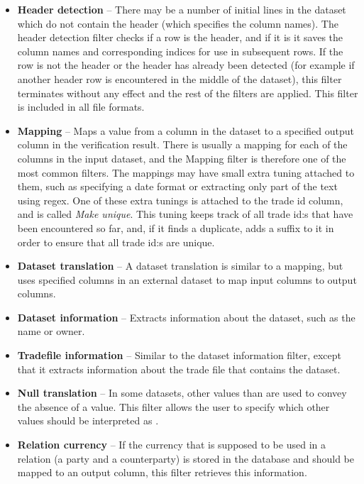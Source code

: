 \begin{itemize}
\item \textbf{Header detection} --
There may be a number of initial lines in the dataset which do not contain the header (which specifies the column names). The header detection filter checks if a row is the header,
and if it is it saves the column names and corresponding indices for use in subsequent rows. If the row is not the header or the header has already been detected
(for example if another header row is encountered in the middle of the dataset), this filter terminates without any effect and the rest of the filters are applied.
This filter is included in all file formats.

\item \textbf{Mapping} --
Maps a value from a column in the dataset to a specified output column in the verification result. There is usually a mapping for each of the columns in the input
dataset, and the Mapping filter is therefore one of the most common filters. The mappings may have small extra tuning attached to them, such as specifying a date
format or extracting only part of the text using regex. One of these extra tunings is attached to the trade id column, and is called \textit{Make unique}.
This tuning keeps track of all trade id:s that have been encountered so far, and, if it finds a duplicate, adds a suffix to it in order to ensure that all trade id:s are unique.

\item \textbf{Dataset translation} --
A dataset translation is similar to a mapping, but uses specified columns in an external dataset to map input columns to output columns.

\item \textbf{Dataset information} --
Extracts information about the dataset, such as the name or owner.

\item \textbf{Tradefile information} --
Similar to the dataset information filter, except that it extracts information about the trade file that contains the dataset.

\item \textbf{Null translation} --
In some datasets, other values than  are used to convey the absence of a value. This filter allows the user to specify which other values
should be interpreted as .

\item \textbf{Relation currency} --
If the currency that is supposed to be used in a relation (a party and a counterparty) is stored in the database and should be mapped to an output column, this
filter retrieves this information.


\end{itemize}
